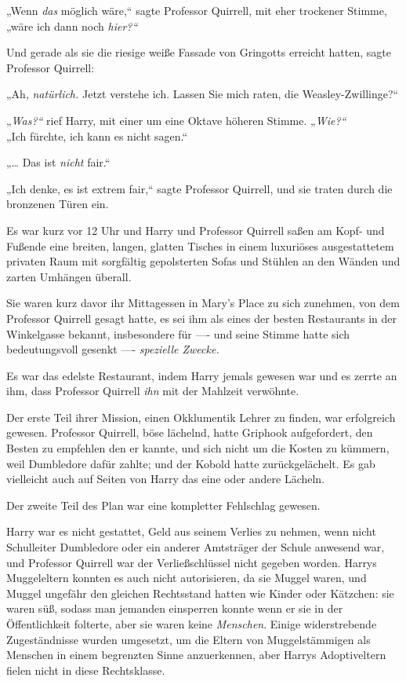{„Wenn \emph{das} möglich wäre,“ sagte Professor Quirrell, mit eher trockener Stimme, „wäre ich dann noch \emph{hier?“}

Und gerade als sie die riesige weiße Fassade von Gringotts erreicht hatten, sagte Professor Quirrell:

„Ah, \emph{natürlich.} Jetzt verstehe ich. Lassen Sie mich raten, die Weasley-Zwillinge?“

„\emph{Was?“} rief Harry, mit einer um eine Oktave höheren Stimme. „\emph{Wie?“}\\ „Ich fürchte, ich kann es nicht sagen.“

„… Das ist \emph{nicht} fair.“

„Ich denke, es ist extrem fair,“ sagte Professor Quirrell, und sie traten durch die bronzenen Türen ein.

Es war kurz vor 12 Uhr und Harry und Professor Quirrell saßen am Kopf- und Fußende eine breiten, langen, glatten Tisches in einem luxuriöses ausgestattetem privaten Raum mit sorgfältig gepolsterten Sofas und Stühlen an den Wänden und zarten Umhängen überall.

Sie waren kurz davor ihr Mittagessen in Mary's Place zu sich zunehmen, von dem Professor Quirrell gesagt hatte, es sei ihm als eines der besten Restaurants in der Winkelgasse bekannt, insbesondere für ---- und seine Stimme hatte sich bedeutungsvoll gesenkt ---- \emph{spezielle Zwecke.}

Es war das edelste Restaurant, indem Harry jemals gewesen war und es zerrte an ihm, dass Professor Quirrell \emph{ihn} mit der Mahlzeit verwöhnte.

Der erste Teil ihrer Mission, einen Okklumentik Lehrer zu finden, war erfolgreich gewesen. Professor Quirrell, böse lächelnd, hatte Griphook aufgefordert, den Besten zu empfehlen den er kannte, und sich nicht um die Kosten zu kümmern, weil Dumbledore dafür zahlte; und der Kobold hatte zurückgelächelt. Es gab vielleicht auch auf Seiten von Harry das eine oder andere Lächeln.

Der zweite Teil des Plan war eine kompletter Fehlschlag gewesen.

Harry war es nicht gestattet, Geld aus seinem Verlies zu nehmen, wenn nicht Schulleiter Dumbledore oder ein anderer Amtsträger der Schule anwesend war, und Professor Quirrell war der Verließschlüssel nicht gegeben worden. Harrys Muggeleltern konnten es auch nicht autorisieren, da sie Muggel waren, und Muggel ungefähr den gleichen Rechtsstand hatten wie Kinder oder Kätzchen: sie waren süß, sodass man jemanden einsperren konnte wenn er sie in der Öffentlichkeit folterte, aber sie waren keine \emph{Menschen}. Einige widerstrebende Zugeständnisse wurden umgesetzt, um die Eltern von Muggelstämmigen als Menschen in einem begrenzten Sinne anzuerkennen, aber Harrys Adoptiveltern fielen nicht in diese Rechtsklasse.

}
